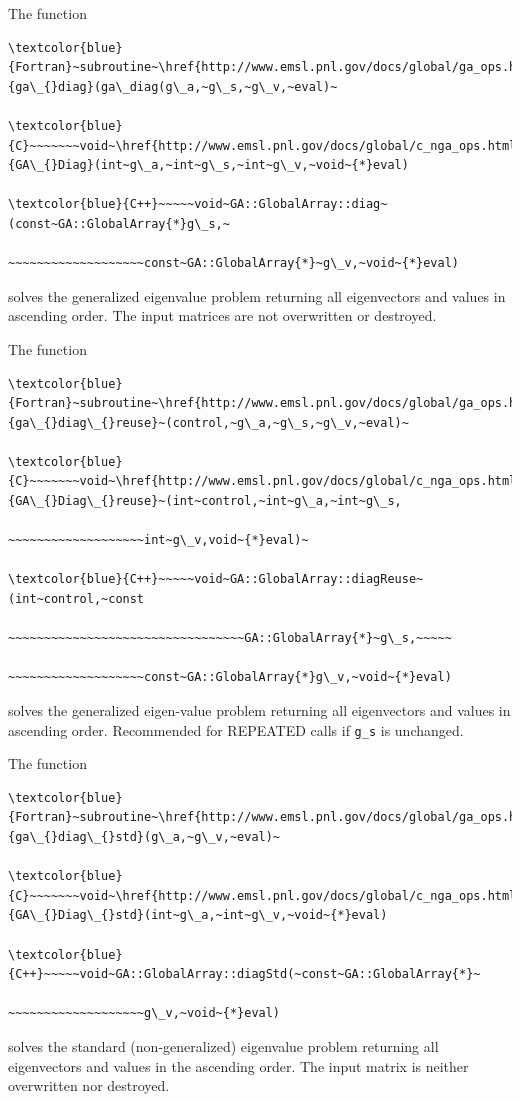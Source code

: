 The function
\begin{verbatim}
\textcolor{blue}{Fortran}~subroutine~\href{http://www.emsl.pnl.gov/docs/global/ga_ops.html\#ga_diag}{ga\_{}diag}(ga\_diag(g\_a,~g\_s,~g\_v,~eval)~

\textcolor{blue}{C}~~~~~~~void~\href{http://www.emsl.pnl.gov/docs/global/c_nga_ops.html\#ga_diag}{GA\_{}Diag}(int~g\_a,~int~g\_s,~int~g\_v,~void~{*}eval)

\textcolor{blue}{C++}~~~~~void~GA::GlobalArray::diag~(const~GA::GlobalArray{*}g\_s,~

~~~~~~~~~~~~~~~~~~~const~GA::GlobalArray{*}~g\_v,~void~{*}eval)
\end{verbatim}
solves the generalized eigenvalue problem returning all eigenvectors
and values in ascending order. The input matrices are not overwritten
or destroyed.

The function
\begin{verbatim}
\textcolor{blue}{Fortran}~subroutine~\href{http://www.emsl.pnl.gov/docs/global/ga_ops.html\#ga_diag_reuse}{ga\_{}diag\_{}reuse}~(control,~g\_a,~g\_s,~g\_v,~eval)~

\textcolor{blue}{C}~~~~~~~void~\href{http://www.emsl.pnl.gov/docs/global/c_nga_ops.html\#ga_diag_reuse}{GA\_{}Diag\_{}reuse}~(int~control,~int~g\_a,~int~g\_s,

~~~~~~~~~~~~~~~~~~~int~g\_v,void~{*}eval)~

\textcolor{blue}{C++}~~~~~void~GA::GlobalArray::diagReuse~(int~control,~const

~~~~~~~~~~~~~~~~~~~~~~~~~~~~~~~~~GA::GlobalArray{*}~g\_s,~~~~~

~~~~~~~~~~~~~~~~~~~const~GA::GlobalArray{*}g\_v,~void~{*}eval)
\end{verbatim}
solves the generalized eigen-value problem returning all eigenvectors
and values in ascending order. Recommended for REPEATED calls if \texttt{g\_s}
is unchanged.

The function
\begin{verbatim}
\textcolor{blue}{Fortran}~subroutine~\href{http://www.emsl.pnl.gov/docs/global/ga_ops.html\#ga_diag_std}{ga\_{}diag\_{}std}(g\_a,~g\_v,~eval)~

\textcolor{blue}{C}~~~~~~~void~\href{http://www.emsl.pnl.gov/docs/global/c_nga_ops.html\#ga_diag_std}{GA\_{}Diag\_{}std}(int~g\_a,~int~g\_v,~void~{*}eval)

\textcolor{blue}{C++}~~~~~void~GA::GlobalArray::diagStd(~const~GA::GlobalArray{*}~

~~~~~~~~~~~~~~~~~~~g\_v,~void~{*}eval)
\end{verbatim}
solves the standard (non-generalized) eigenvalue problem returning
all eigenvectors and values in the ascending order. The input matrix
is neither overwritten nor destroyed. 


